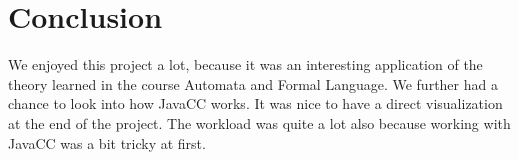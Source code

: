 \chapter{Conclusion}
\label{chap:conclusion}
We enjoyed this project a lot, because it was an interesting application of the theory learned in the course Automata and Formal Language. We further had a chance to look into how JavaCC works. It was nice to have a direct visualization at the end of the project. The workload was quite a lot also because working with JavaCC was a bit tricky at first.